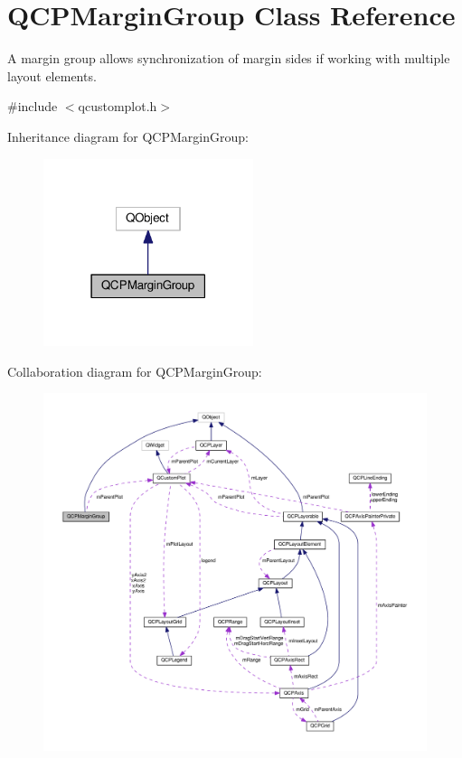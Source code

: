 \hypertarget{classQCPMarginGroup}{}\section{Q\+C\+P\+Margin\+Group Class Reference}
\label{classQCPMarginGroup}


A margin group allows synchronization of margin sides if working with multiple layout elements.  




{\ttfamily \#include $<$qcustomplot.\+h$>$}



Inheritance diagram for Q\+C\+P\+Margin\+Group\+:
\nopagebreak
\begin{figure}[H]
\begin{center}
\leavevmode
\includegraphics[width=174pt]{classQCPMarginGroup__inherit__graph}
\end{center}
\end{figure}


Collaboration diagram for Q\+C\+P\+Margin\+Group\+:
\nopagebreak
\begin{figure}[H]
\begin{center}
\leavevmode
\includegraphics[width=350pt]{classQCPMarginGroup__coll__graph}
\end{center}
\end{figure}
